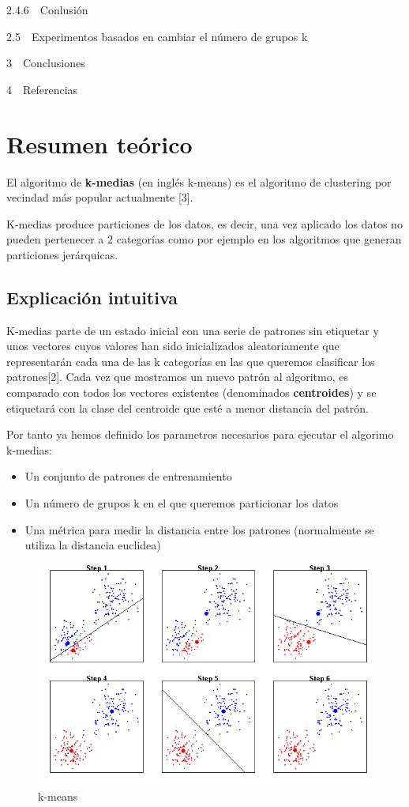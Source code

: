 \documentclass[11pt]{article}
\makeatletter
\def\maxwidth{\ifdim\Gin@nat@width>\linewidth\linewidth
    \else\Gin@nat@width\fi}
\let\Oldincludegraphics\includegraphics
\renewcommand{\includegraphics}[1]{\Oldincludegraphics[width=.8\maxwidth]{#1}}
\providecommand{\tightlist}{%
      \setlength{\itemsep}{0pt}\setlength{\parskip}{0pt}}
\makeatother
\begin{document}
{2.4.6~~}Conlusión

{2.5~~}Experimentos basados en cambiar el número de grupos k

{3~~}Conclusiones

{4~~}Referencias

    \section{Resumen teórico}\label{resumen-teuxf3rico}

El algoritmo de \textbf{k-medias} (en inglés k-means) es el algoritmo de
clustering por vecindad más popular actualmente {[}3{]}.

K-medias produce particiones de los datos, es decir, una vez aplicado
los datos no pueden pertenecer a 2 categorías como por ejemplo en los
algoritmos que generan particiones jerárquicas.

\subsection{Explicación intuitiva}\label{explicaciuxf3n-intuitiva}

K-medias parte de un estado inicial con una serie de patrones sin
etiquetar y unos vectores cuyos valores han sido inicializados
aleatoriamente que representarán cada una de las k categorías en las que
queremos clasificar los patrones{[}2{]}. Cada vez que mostramos un nuevo
patrón al algoritmo, es comparado con todos los vectores existentes
(denominados \textbf{centroides}) y se etiquetará con la clase del
centroide que esté a menor distancia del patrón.

Por tanto ya hemos definido los parametros necesarios para ejecutar el
algorimo k-medias:

\begin{itemize}
\tightlist
\item
  Un conjunto de patrones de entrenamiento
\item
  Un número de grupos k en el que queremos particionar los datos
\item
  Una métrica para medir la distancia entre los patrones (normalmente se
  utiliza la distancia euclidea)
\end{itemize}

\begin{figure}
\centering
\includegraphics{k_means.png}
\caption{k-means}
\end{figure}
\end{document}
